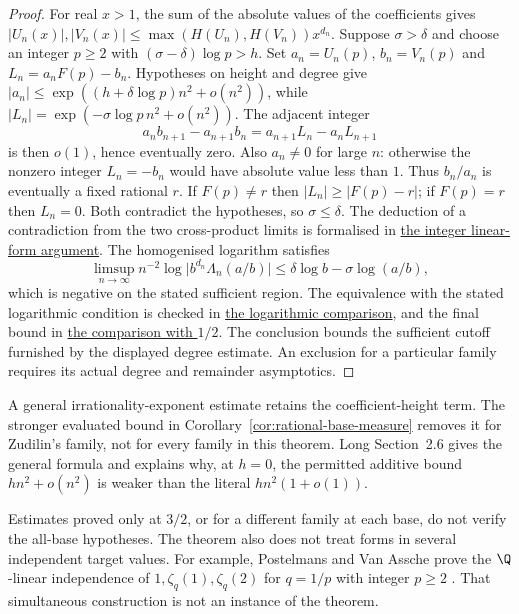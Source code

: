 \documentclass[11pt]{article}
\begin{document}
\begin{proof}
For real $x>1$, the sum of the absolute values of the coefficients gives
$|U_n(x)|,|V_n(x)|\le\max(H(U_n),H(V_n))x^{d_n}$.
Suppose $\sigma>\delta$ and choose an integer $p\ge2$ with
$(\sigma-\delta)\log p>h$.  Set $a_n=U_n(p)$, $b_n=V_n(p)$ and
$L_n=a_n F(p)-b_n$.  Hypotheses on height and degree give
$|a_n|\le\exp((h+\delta\log p)n^2+o(n^2))$, while
$|L_n|=\exp(-\sigma\log p\,n^2+o(n^2))$.  The adjacent integer
\[
 a_nb_{n+1}-a_{n+1}b_n=a_{n+1}L_n-a_n L_{n+1}
\]
is then $o(1)$, hence eventually zero.  Also $a_n\ne0$ for large $n$:
otherwise the nonzero integer $L_n=-b_n$ would have absolute value less
than $1$.  Thus $b_n/a_n$ is eventually a fixed rational $r$.  If
$F(p)\ne r$ then $|L_n|\ge|F(p)-r|$; if $F(p)=r$ then $L_n=0$.  Both
contradict the hypotheses, so $\sigma\le\delta$.
The deduction of a contradiction from the two cross-product limits is
formalised in \href{https://github.com/wcook04/plectis-erdos/blob/f36a98bf3d3e6f65f1074e3b800e3293d5b8a51a/ErdosProblems/Erdos1049/PaperRankTwoCapR7.lean#L123}{the integer linear-form argument}.
The homogenised logarithm satisfies
\[
 \limsup_{n\to\infty} n^{-2}\log\bigl|b^{d_n}\Lambda_n(a/b)\bigr|
 \le \delta\log b-\sigma\log(a/b),
\]
which is negative on the stated sufficient region.
The equivalence with the stated logarithmic condition is checked in
\href{https://github.com/wcook04/plectis-erdos/blob/f36a98bf3d3e6f65f1074e3b800e3293d5b8a51a/ErdosProblems/Erdos1049/PaperRankTwoCapR7.lean#L144}{the logarithmic comparison}, and the final bound in
\href{https://github.com/wcook04/plectis-erdos/blob/f36a98bf3d3e6f65f1074e3b800e3293d5b8a51a/ErdosProblems/Erdos1049/PaperRankTwoCapR7.lean#L155}{the comparison with $1/2$}.
The conclusion bounds the
sufficient cutoff furnished by the displayed degree estimate.  An exclusion for a
particular family requires its actual degree and remainder asymptotics.
\end{proof}

A general irrationality-exponent estimate retains the coefficient-height
term. The stronger evaluated bound in
Corollary~\ref{cor:rational-base-measure} removes it for Zudilin's family,
not for every family in this theorem. Long Section~2.6 gives the general
formula and explains why, at $h=0$, the permitted additive bound
$hn^2+o(n^2)$ is weaker than the literal $hn^2(1+o(1))$.

Estimates proved only at $3/2$, or for a different family at each base,
do not verify the all-base hypotheses. The theorem also does not treat
forms in several independent target values.
For example, Postelmans and Van Assche prove the $\Q$-linear
independence of $1,\zeta_q(1),\zeta_q(2)$ for $q=1/p$ with integer
$p\ge2$ \cite[Thm.~1.3, p.~3; Sec.~6]{postelmansvanassche2007}.
That simultaneous construction is not an instance of the theorem.
\end{document}
